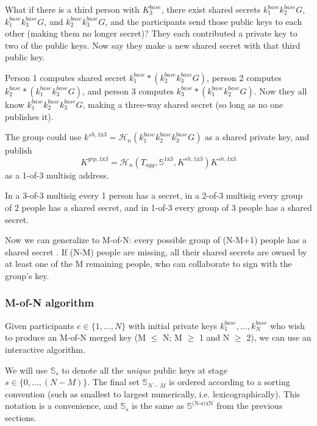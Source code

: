 What if there is a third person with $K^{base}_3$, there exist shared secrets $k^{base}_1 k^{base}_2 G$, $k^{base}_1 k^{base}_3 G$, and $k^{base}_2 k^{base}_3 G$, and the participants send those public keys to each other (making them no longer secret)? They each contributed a private key to two of the public keys. Now say they make a new shared secret with that third public key.

Person 1 computes shared secret $k^{base}_1*(k^{base}_2 k^{base}_3 G)$, person 2 computes $k^{base}_2*(k^{base}_1 k^{base}_3 G)$, and person 3 computes $k^{base}_3*(k^{base}_1 k^{base}_2 G)$. Now they all know $k^{base}_1 k^{base}_2 k^{base}_3 G$, making a three-way shared secret (so long as no one publishes it).

The group could use $k^{sh,\textrm{1x3}} = \mathcal{H}_n(k^{base}_1 k^{base}_2 k^{base}_3 G)$ as a shared private key, and publish\vspace{.155cm} \[K^{grp,\textrm{1x3}} = \mathcal{H}_n(T_{agg},\mathbb{S}^{\textrm{1x3}},K^{sh,\textrm{1x3}}) K^{sh,\textrm{1x3}}\] as a 1-of-3 multisig address.

In a 3-of-3 multisig every 1 person has a secret, in a 2-of-3 multisig every group of 2 people has a shared secret, and in 1-of-3 every group of 3 people has a shared secret.

Now we can generalize to M-of-N: every possible group of (N-M+1) people has a shared secret \cite{old-multisig-mrl-note}. If (N-M) people are missing, all their shared secrets are owned by at least one of the M remaining people, who can collaborate to sign with the group's key.

\subsubsection*{M-of-N algorithm}

Given participants $e \in \{1,...,N\}$ with initial private keys $k^{base}_1,...,k^{base}_N$ who wish to produce an M-of-N merged key (M $\leq$ N; M $\geq$ 1 and N $\geq$ 2), we can use an interactive algorithm.

We will use $\mathbb{S}_s$ to denote all the {\em unique} public keys at stage $s \in \{0,...,(N-M)\}$. The final set $\mathbb{S}_{N-M}$ is ordered according to a sorting convention (such as smallest to largest numerically, i.e. lexicographically). This notation is a convenience, and $\mathbb{S}_s$ is the same as $\mathbb{S}^{\textrm{(N-s)xN}}$ from the previous sections.

